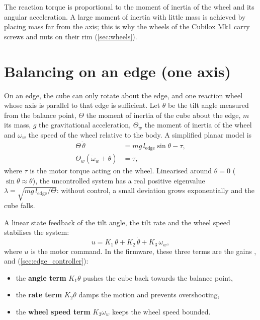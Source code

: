 The reaction torque is proportional to the moment of inertia of the wheel and its angular
acceleration. A large moment of inertia with little mass is achieved by placing mass far from the
axis; this is why the wheels of the Cubilox Mk1 carry screws and nuts on their rim
(\cref{sec:wheels}).

\section{Balancing on an edge (one axis)}
\label{sec:edge_model}

On an edge, the cube can only rotate about the edge, and one reaction wheel whose axis is parallel
to that edge is sufficient. Let $\theta$ be the tilt angle measured from the balance point,
$\Theta$ the moment of inertia of the cube about the edge, $m$ its mass, $g$ the gravitational
acceleration, $\Theta_w$ the moment of inertia of the wheel and $\omega_w$ the speed of the wheel
relative to the body. A simplified planar model is
\begin{align}
  \Theta\,\ddot\theta &= m g\, l_\text{edge} \sin\theta - \tau, \label{eq:edge_body}\\
  \Theta_w \left(\dot\omega_w + \ddot\theta\right) &= \tau, \label{eq:edge_wheel}
\end{align}
where $\tau$ is the motor torque acting on the wheel. Linearised around $\theta = 0$
($\sin\theta \approx \theta$), the uncontrolled system has a real positive eigenvalue
$\lambda = \sqrt{m g\, l_\text{edge}/\Theta}$: without control, a small deviation grows
exponentially and the cube falls.

A linear state feedback of the tilt angle, the tilt rate and the wheel speed stabilises the
system:
\begin{equation}
  u = K_1\,\theta + K_2\,\dot\theta + K_3\,\omega_w ,
  \label{eq:edge_law}
\end{equation}
where $u$ is the motor command. In the firmware, these three terms are the gains
,  and  (\cref{sec:edge_controller}):
\begin{itemize}
  \item the \textbf{angle term} $K_1\theta$ pushes the cube back towards the balance point,
  \item the \textbf{rate term} $K_2\dot\theta$ damps the motion and prevents overshooting,
  \item the \textbf{wheel speed term} $K_3\omega_w$ keeps the wheel speed bounded.
\end{itemize}

